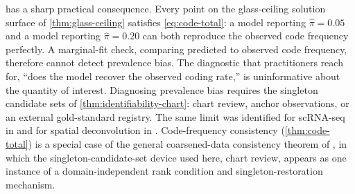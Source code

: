  has a sharp practical consequence. Every point on
the glass-ceiling solution surface of \cref{thm:glass-ceiling}
satisfies \eqref{eq:code-total}: a model reporting $\hat\pi = 0.05$ and
a model reporting $\hat\pi = 0.20$ can both reproduce the observed code
frequency perfectly. A marginal-fit check, comparing predicted to
observed code frequency, therefore cannot detect prevalence bias. The
diagnostic that practitioners reach for, ``does the model recover the
observed coding rate,'' is uninformative about the quantity of
interest. Diagnosing prevalence bias requires the singleton candidate
sets of \cref{thm:identifiability-chart}: chart review, anchor
observations, or an external gold-standard registry. The same limit was
identified for scRNA-seq in \citet{towell2026scrnacoarsening} and for
spatial deconvolution in \citet{towell2026spatialcoarsening}.
Code-frequency consistency (\cref{thm:code-total}) is a special case of
the general coarsened-data consistency theorem of
\citet{towell2026synthesis}, in which the singleton-candidate-set
device used here, chart review, appears as one instance of a
domain-independent rank condition and singleton-restoration mechanism.
